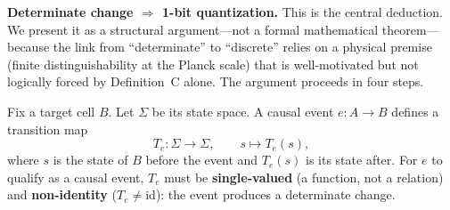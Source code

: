 \documentclass[aps,prd,twocolumn,showpacs,superscriptaddress,preprintnumbers]{revtex4-2}
\begin{document}
\textbf{Determinate change $\Rightarrow$ 1-bit quantization.}
This is the central deduction. We present it as a structural argument---not a formal mathematical theorem---because the link from ``determinate'' to ``discrete'' relies on a physical premise (finite distinguishability at the Planck scale) that is well-motivated but not logically forced by Definition~C alone. The argument proceeds in four steps.

Fix a target cell $B$. Let $\Sigma$ be its state space. A causal event $e: A \to B$ defines a transition map
\begin{equation}
T_e: \Sigma \to \Sigma, \qquad s \mapsto T_e(s),
\label{eq:transition}
\end{equation}
where $s$ is the state of $B$ before the event and $T_e(s)$ is its state after. For $e$ to qualify as a causal event, $T_e$ must be \textbf{single-valued} (a function, not a relation) and \textbf{non-identity} ($T_e \neq \mathrm{id}$): the event produces a determinate change.
\end{document}

